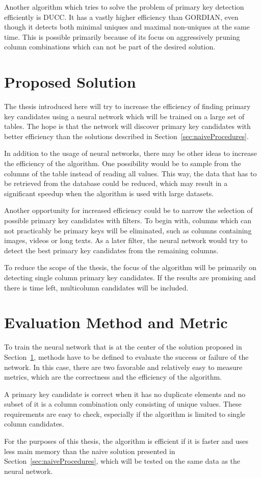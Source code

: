 \documentclass[a4paper]{article}
\begin{document}
Another algorithm which tries to solve the problem of primary key detection efficiently is DUCC. It has a vastly higher efficiency than GORDIAN, even though it detects both minimal uniques and maximal non-uniques at the same time. This is possible primarily because of its focus on aggressively pruning column combinations which can not be part of the desired solution.


\section{Proposed Solution}\label{sec:proposedSolution}
The thesis introduced here will try to increase the efficiency of finding primary key candidates using a neural network  which will be trained on a large set of tables. The hope is that the network will discover primary key candidates with better efficiency than the solutions described in Section~\ref{sec:naiveProcedures}.

In addition to the usage of neural networks, there may be other ideas to increase the efficiency of the algorithm. One possibility would be to sample from the columns of the table instead of reading all values. This way, the data that has to be retrieved from the database could be reduced, which may result in a significant speedup when the algorithm is used with large datasets.

Another opportunity for increased efficiency could be to narrow the selection of possible primary key candidates with filters. To begin with, columns which can not practicably be primary keys will be eliminated, such as columns containing images, videos or long texts. As a later filter, the neural network would try to detect the best primary key candidates from the remaining columns.

To reduce the scope of the thesis, the focus of the algorithm will be primarily on detecting single column primary key candidates. If the results are promising and there is time left, multicolumn candidates will be included.


\section{Evaluation Method and Metric}
To train the neural network that is at the center of the solution proposed in Section~\ref{sec:proposedSolution}, methods have to be defined to evaluate the success or failure of the network. In this case, there are two favorable and relatively easy to measure metrics, which are the correctness and the efficiency of the algorithm.

A primary key candidate is correct when it has no duplicate elements and no subset of it is a column combination only consisting of unique values. These requirements are easy to check, especially if the algorithm is limited to single column candidates.

For the purposes of this thesis, the algorithm is efficient if it is faster and uses less main memory than the naive solution presented in Section~\ref{sec:naiveProcedures}, which will be tested on the same data as the neural network.
\end{document}
